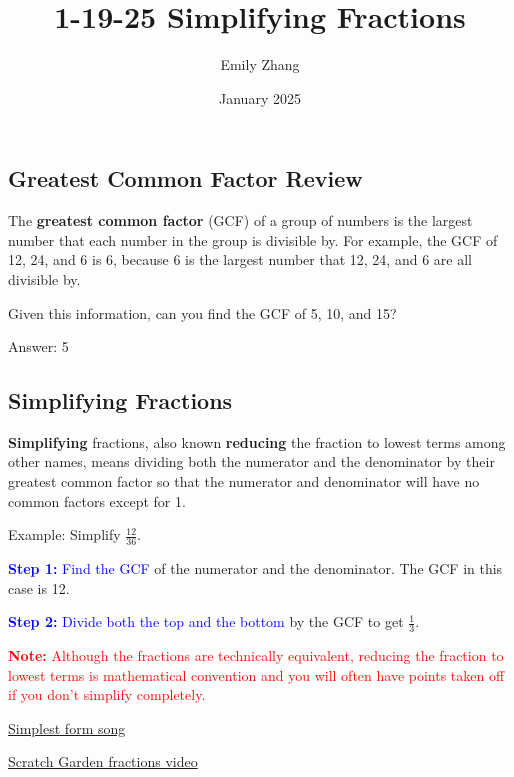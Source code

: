 \documentclass[a4paper, 12pt]{article}
\title{1-19-25 Simplifying Fractions}
\author{Emily Zhang}
\date{January 2025}
\begin{document}
\maketitle

\subsection*{Greatest Common Factor Review}
The \textbf{greatest common factor} (GCF) of a group of numbers is the largest number that each number in the group is divisible by. For example, the GCF of 12, 24, and 6 is 6, because 6 is the largest number that 12, 24, and 6 are all divisible by.

Given this information, can you find the GCF of 5, 10, and 15?

Answer: 5

\subsection*{Simplifying Fractions}
\textbf{Simplifying} fractions, also known \textbf{reducing} the fraction to lowest terms among other names, means dividing both the numerator and the denominator by their greatest common factor so that the numerator and denominator will have no common factors except for 1.

Example: Simplify $\frac{12}{36}$.

\textcolor{blue}{\textbf{Step 1:} Find the GCF} of the numerator and the denominator. The GCF in this case is 12.

\textcolor{blue}{\textbf{Step 2:} Divide both the top and the bottom} by the GCF to get $\boxed{\frac{1}{3}}$.

\textcolor{red}{\textbf{Note:} Although the fractions are technically equivalent, reducing the fraction to lowest terms is mathematical convention and you will often have points taken off if you don't simplify completely.}

\href{https://www.youtube.com/watch?v=U-1KjlJAA6M}{Simplest form song}

\href{https://www.youtube.com/watch?v=362JVVvgYPE}{Scratch Garden fractions video}
\end{document}
